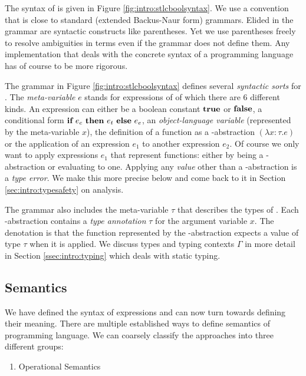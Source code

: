 {The syntax of \stlcbool is given in Figure \ref{fig:intro:stlcboolsyntax}. We
use a convention that is close to standard (extended Backus-Naur form)
grammars. Elided in the grammar are syntactic constructs like parentheses. Yet
we use parentheses freely to resolve ambiguities in terms even if the grammar
does not define them. Any implementation that deals with the concrete syntax of
a programming language has of course to be more rigorous.

The grammar in Figure \ref{fig:intro:stlcboolsyntax} defines several
\emph{syntactic sorts} for \stlcbool. The \emph{meta-variable} $e$ stands for
expressions of \stlcbool of which there are 6 different kinds. An expression can
either be a boolean constant $\textbf{true}$ or $\textbf{false}$, a conditional form
$\textbf{if}~{e_c}~\textbf{then}~{e_t}~\textbf{else}~{e_e}$, an \emph{object-language variable} (represented by the
meta-variable $x$), the definition of a function as a \textlambda-abstraction
$(\lambda x:\tau.e)$ or the application of an expression $e_1$ to another
expression $e_2$. Of course we only want to apply expressions $e_1$ that
represent functions: either by being a \textlambda-abstraction or evaluating to
one. Applying any \emph{value} other than a \textlambda-abstraction is a
\emph{type error}. We make this more precise below and come back to it in
Section \ref{sec:intro:typesafety} on analysis.

The grammar also includes the meta-variable $\tau$ that describes the types of
\stlcbool. Each \textlambda-abstraction contains a \emph{type annotation} $\tau$
for the argument variable $x$. The denotation is that the function represented
by the \textlambda-abstraction expects a value of type $\tau$ when it is
applied. We discuss types and typing contexts $\Gamma$ in more detail in Section
\ref{ssec:intro:typing} which deals with static typing.


\subsection{Semantics}\label{ssec:intro:semantics}

We have defined the syntax of \stlcbool expressions and can now turn towards
defining their meaning. There are multiple established ways to define semantics
of programming language. We can coarsely classify the approaches into three
different groups:

\begin{enumerate}
\item Operational Semantics


\end{enumerate}}

